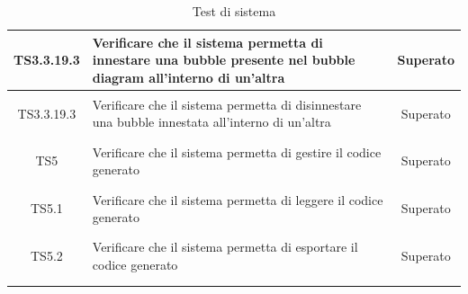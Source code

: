 \documentclass[../PianoDiQualifica.tex]{subfiles}
\begin{document}
\begin{longtable}{|c|>{\centering}p{10cm}|c|}
	
	\hline
	\hypertarget{TS3.3.19.3}{TS3.3.19.3} & Verificare che il sistema permetta di innestare una bubble presente nel bubble diagram all'interno di un'altra&Superato \\
	\hline
	\hypertarget{TS3.3.19.3}{TS3.3.19.3} & Verificare che il sistema permetta di disinnestare una bubble innestata all'interno di un'altra&Superato \\
	\hline
	
	\hypertarget{TS5}{TS5} & Verificare che il sistema permetta di gestire il codice generato & Superato \\
	\hline
	\hypertarget{TS5.1}{TS5.1} & Verificare che il sistema permetta di leggere il codice generato & Superato \\
	\hline
	\hypertarget{TS5.2}{TS5.2} & Verificare che il sistema permetta di esportare il codice generato & Superato \\
	\hline
\caption[Test di sistema]{Test di sistema}
\label{tabella:TestSistema}
\end{longtable}

\newpage
\end{document}
